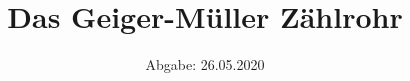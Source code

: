 

\subject{V703}
\title{Das Geiger-Müller Zählrohr}
\date{%
  Abgabe: 26.05.2020
}



\maketitle
\thispagestyle{empty}
\tableofcontents
\newpage







\printbibliography{}


